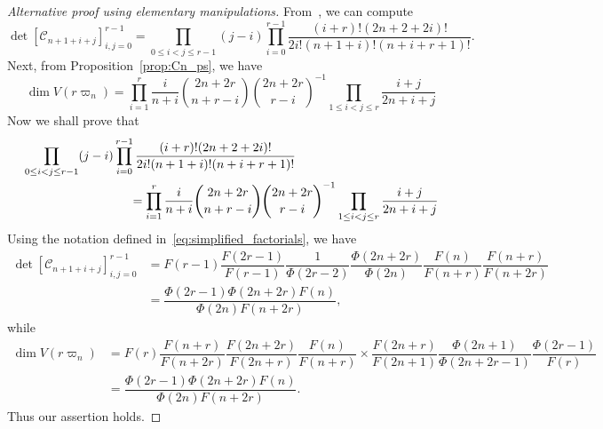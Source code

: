\documentclass[11pt, leqno]{amsart}
\theoremstyle{plain}
\theoremstyle{definition}
\numberwithin{equation}{section}
\newcommand{\Cat}{\mathcal{C}} %
\begin{document}
\begin{proof}[Alternative proof using elementary manipulations]
From~\cite[Thm.~3]{Krat10}, we can compute
\[
\det [\Cat_{n+1+i+j} ]_{i,j=0}^{r-1}  = \prod_{0 \le i < j \le r-1}(j-i) \prod_{i=0}^{r-1} \dfrac{(i+r)!(2n+2+2i)!}{2i!(n+1+i)!(n+i+r+1)!}.
\]
Next, from Proposition~\ref{prop:Cn_ps}, we have
\[
\dim V(r \varpi_n) = \prod_{i=1}^r \dfrac{i}{n+i} \binom{2n+2r}{n+r-i}\binom{2n+2r}{r-i}^{-1} \prod_{1 \leq i < j \leq r} \frac{i+j}{2n+i+j}
\]
Now we shall prove that
\begin{align*}
& \prod_{0 \le i < j \le r-1}(j-i) \prod_{i=0}^{r-1} \dfrac{(i+r)!(2n+2+2i)!}{2i!(n+1+i)!(n+i+r+1)!}  \\
& \hspace{20ex} =  \prod_{i=1}^r \dfrac{i}{n+i} \binom{2n+2r}{n+r-i}\binom{2n+2r}{r-i}^{-1} \prod_{1 \leq i < j \leq r} \frac{i+j}{2n+i+j} \end{align*}
Using the notation defined in~\eqref{eq:simplified_factorials}, we have
\begin{align*}
\det [\Cat_{n+1+i+j} ]_{i,j=0}^{r-1} &= F(r-1) \dfrac{F(2r-1)}{F(r-1)}\dfrac{1}{\Phi(2r-2)}\dfrac{\Phi(2n+2r)}{\Phi(2n)}\dfrac{F(n)}{F(n+r)}\dfrac{F(n+r)}{F(n+2r)} \\
&= \dfrac{\Phi(2r-1)\Phi(2n+2r)F(n)}{\Phi(2n)F(n+2r)},
\end{align*}
while
\begin{align*}
\dim V(r \varpi_n) &= F(r)  \dfrac{F(n+r)}{F(n+2r)}\dfrac{F(2n+2r)}{F(2n+r)}\dfrac{F(n)}{F(n+r)} \times \dfrac{F(2n+r)}{F(2n+1)}\dfrac{\Phi(2n+1)}{\Phi(2n+2r-1)}\dfrac{\Phi(2r-1)}{F(r)} \\
&= \dfrac{\Phi(2r-1)\Phi(2n+2r)F(n)}{\Phi(2n)F(n+2r)}.
\end{align*}
Thus our assertion holds.
\end{proof}




{}
\end{document}
